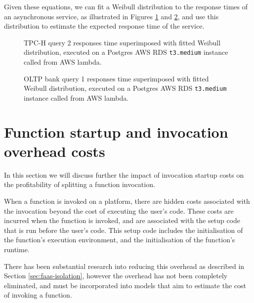 Given these equations, we can fit a Weibull distribution to the response times of an asynchronous service, as illustrated in Figures \ref{fig:tpch-q2-weibull} and \ref{fig:oltp-q1-weibull}, and use this distribution to estimate the expected response time of the service.

\begin{figure}
    \begin{center}
        
    \end{center}
    \caption{TPC-H query 2 responses time superimposed with fitted Weibull distribution, executed on a Postgres AWS RDS \texttt{t3.medium} instance called from AWS lambda.}
    \label{fig:tpch-q2-weibull}
\end{figure}

\begin{figure}
    \begin{center}
        
    \end{center}
    \caption{OLTP bank query 1 responses time superimposed with fitted Weibull distribution, executed on a Postgres AWS RDS \texttt{t3.medium} instance called from AWS lambda.}
    \label{fig:oltp-q1-weibull}
\end{figure}

\section{Function startup and invocation overhead costs}
\label{sec:faas-function-invocation-startup-costs}
In this section we will discuss further the impact of invocation startup costs on the profitability of splitting a function invocation.

When a function is invoked on a \faas{} platform, there are hidden costs associated with the invocation beyond the cost of executing the user's code. These costs are incurred when the function is invoked, and are associated with the setup code that is run before the user's code. This setup code includes the initialisation of the function's execution environment, and the initialisation of the function's runtime.

There has been substantial research into reducing this overhead as described in Section \ref{sec:faas-isolation}, however the overhead has not been completely eliminated, and must be incorporated into models that aim to estimate the cost of invoking a function.


